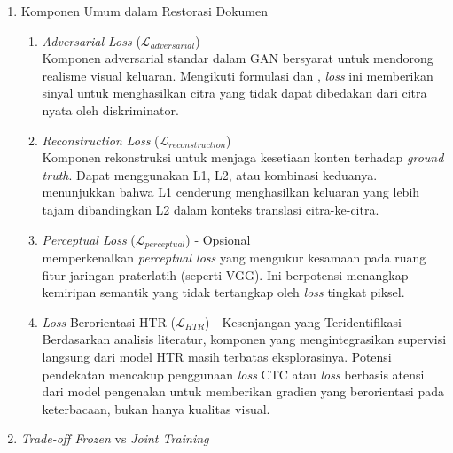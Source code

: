 \begin{enumerate}[leftmargin=*, labelindent=0pt, itemsep=1ex, topsep=0pt]

\item Komponen Umum dalam Restorasi Dokumen

\begin{enumerate}[leftmargin=1.5em, labelsep=0.5em, itemindent=0pt, label=\alph*., topsep=0pt, parsep=0pt, itemsep=0pt]
      \item \textit{Adversarial Loss} ($\mathcal{L}_{adversarial}$) \\
            Komponen adversarial standar dalam GAN bersyarat untuk mendorong realisme visual keluaran. Mengikuti formulasi \parencite{goodfellow2014} dan \parencite{isola2017}, \textit{loss} ini memberikan sinyal untuk menghasilkan citra yang tidak dapat dibedakan dari citra nyata oleh diskriminator.

      \item \textit{Reconstruction Loss} ($\mathcal{L}_{reconstruction}$) \\
            Komponen rekonstruksi untuk menjaga kesetiaan konten terhadap \textit{ground truth}. Dapat menggunakan L1, L2, atau kombinasi keduanya. \parencite{isola2017} menunjukkan bahwa L1 cenderung menghasilkan keluaran yang lebih tajam dibandingkan L2 dalam konteks translasi citra-ke-citra.

      \item \textit{Perceptual Loss} ($\mathcal{L}_{perceptual}$) - Opsional \\
            \textcite{johnson2016} memperkenalkan \textit{perceptual loss} yang mengukur kesamaan pada ruang fitur jaringan praterlatih (seperti VGG). Ini berpotensi menangkap kemiripan semantik yang tidak tertangkap oleh \textit{loss} tingkat piksel.

      \item \textit{Loss} Berorientasi HTR ($\mathcal{L}_{HTR}$) - Kesenjangan yang Teridentifikasi \\
            Berdasarkan analisis literatur, komponen yang mengintegrasikan supervisi langsung dari model HTR masih terbatas eksplorasinya. Potensi pendekatan mencakup penggunaan \textit{loss} CTC atau \textit{loss} berbasis atensi dari model pengenalan untuk memberikan gradien yang berorientasi pada keterbacaan, bukan hanya kualitas visual.
\end{enumerate}

\item \textit{Trade-off Frozen} vs \textit{Joint Training}


\end{enumerate}
